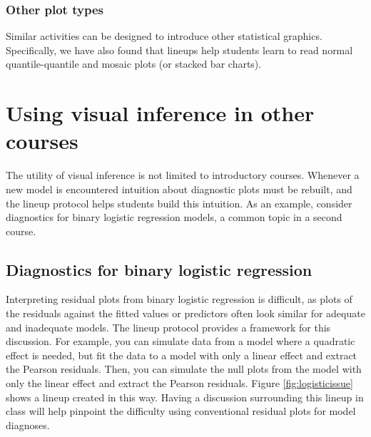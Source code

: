 \documentclass[12pt]{article}
\begin{document}
\hypertarget{other-plot-types}{%
\subsubsection{Other plot types}\label{other-plot-types}}

Similar activities can be designed to introduce other statistical
graphics. Specifically, we have also found that lineups help students
learn to read normal quantile-quantile and mosaic plots (or stacked bar
charts).

\section{Using visual inference in other courses}
\label{sec:othercourses}

The utility of visual inference is not limited to introductory courses.
Whenever a new model is encountered intuition about diagnostic plots
must be rebuilt, and the lineup protocol helps students build this
intuition. As an example, consider diagnostics for binary logistic
regression models, a common topic in a second course.

\hypertarget{diagnostics-for-binary-logistic-regression}{%
\subsection{Diagnostics for binary logistic
regression}\label{diagnostics-for-binary-logistic-regression}}

Interpreting residual plots from binary logistic regression is
difficult, as plots of the residuals against the fitted values or
predictors often look similar for adequate and inadequate models. The
lineup protocol provides a framework for this discussion. For example,
you can simulate data from a model where a quadratic effect is needed,
but fit the data to a model with only a linear effect and extract the
Pearson residuals. Then, you can simulate the null plots from the model
with only the linear effect and extract the Pearson residuals. Figure
\ref{fig:logisticissue} shows a lineup created in this way. Having a
discussion surrounding this lineup in class will help pinpoint the
difficulty using conventional residual plots for model diagnoses.
\end{document}
